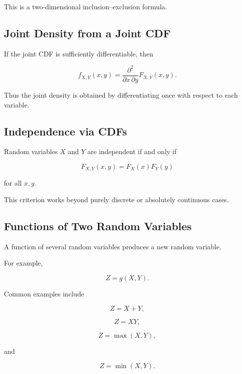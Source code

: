 This is a two-dimensional inclusion--exclusion formula.

\subsection{Joint Density from a Joint CDF}
\label{subsec:joint-density-from-cdf}

If the joint CDF is sufficiently differentiable, then

\[
\boxed{
f_{X,Y}(x,y)
=
\frac{\partial^2}{
\partial x\,\partial y
}
F_{X,Y}(x,y).
}
\]

Thus the joint density is obtained by differentiating once with respect
to each variable.

\subsection{Independence via CDFs}
\label{subsec:independence-via-cdfs}

Random variables \(X\) and \(Y\) are independent if and only if

\[
\boxed{
F_{X,Y}(x,y)
=
F_X(x)F_Y(y)
}
\]

for all \(x,y\).

This criterion works beyond purely discrete or absolutely continuous
cases.

\subsection{Functions of Two Random Variables}
\label{subsec:functions-two-random-variables}

A function of several random variables produces a new random variable.

For example,

\[
\boxed{
Z=g(X,Y).
}
\]

Common examples include

\[
Z=X+Y,
\]

\[
Z=XY,
\]

\[
Z=\max(X,Y),
\]

and

\[
Z=\min(X,Y).
\]

